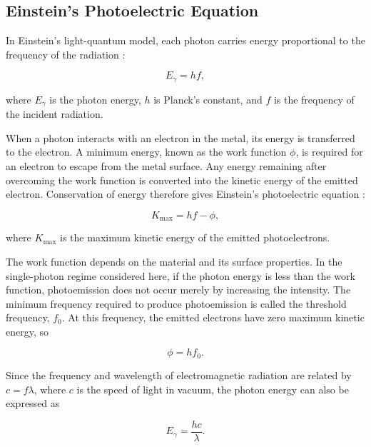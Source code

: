 \documentclass[12pt,a4paper]{article}
\begin{document}
\subsection{Einstein's Photoelectric Equation}

In Einstein's light-quantum model, each photon carries energy proportional to the frequency of the radiation \cite{einstein1905}:

\begin{equation}
    E_{\gamma} = hf,
    \label{eq:photon_energy}
\end{equation}

where \(E_{\gamma}\) is the photon energy, \(h\) is Planck's constant, and \(f\) is the frequency of the incident radiation.

When a photon interacts with an electron in the metal, its energy is transferred to the electron. A minimum energy, known as the work function \(\phi\), is required for an electron to escape from the metal surface. Any energy remaining after overcoming the work function is converted into the kinetic energy of the emitted electron. Conservation of energy therefore gives Einstein's photoelectric equation \cite{einstein1905}:

\begin{equation}
    K_{\max} = hf - \phi,
    \label{eq:einstein}
\end{equation}

where \(K_{\max}\) is the maximum kinetic energy of the emitted photoelectrons.

The work function depends on the material and its surface properties. In the single-photon regime considered here, if the photon energy is less than the work function, photoemission does not occur merely by increasing the intensity. The minimum frequency required to produce photoemission is called the threshold frequency, \(f_0\). At this frequency, the emitted electrons have zero maximum kinetic energy, so

\begin{equation}
    \phi = hf_0.
    \label{eq:threshold}
\end{equation}

Since the frequency and wavelength of electromagnetic radiation are related by \(c=f\lambda\), where \(c\) is the speed of light in vacuum, the photon energy can also be expressed as

\begin{equation}
    E_{\gamma} = \frac{hc}{\lambda}.
    \label{eq:wavelength_energy}
\end{equation}
\end{document}
